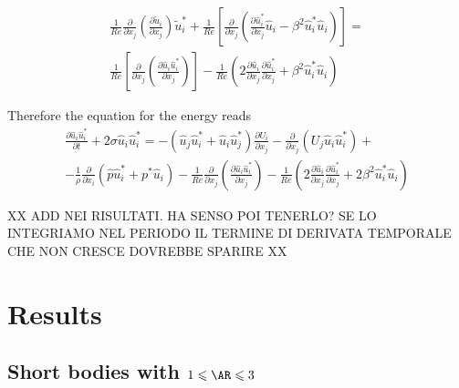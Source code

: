 \documentclass{jfm}
\begin{document}
\begin{itemize}
\begin{equation}
\begin{gathered}
    \frac{1}{Re} \frac{\partial}{\partial x_j} \left( \frac{\partial \tilde{u}_i}{\partial x_j} \right) \tilde{u}_i^* +
    \frac{1}{Re} \left[ \frac{\partial}{\partial x_j} \left( \frac{\partial \hat{u}_i^*}{\partial x_j} \hat{u}_i - \beta^2 \hat{u}_i^* \hat{u}_i \right) \right] = \\
    \frac{1}{Re} \left[ \frac{\partial}{\partial x_j} \left( \frac{\partial \hat{u}_i \hat{u}_i^*}{\partial x_j} \right) \right]
   -\frac{1}{Re} \left( 2 \frac{\partial \hat{u}_i}{\partial x_j} \frac{\partial \hat{u}_i^*}{\partial x_j} + \beta^2 \hat{u}_i^* \hat{u}_i \right)
  \end{gathered}
  \end{equation}
\end{itemize}

Therefore the equation for the energy reads
%
\begin{equation}
\begin{gathered}
\frac{\partial \hat{u}_i \hat{u}_i^*}{\partial t} + 2 \sigma \hat{u}_i \hat{u}_i^* = 
- \left( \hat{u}_j \hat{u}_i^* + \hat{u}_i \hat{u}_j^* \right) \frac{\partial U_i}{\partial x_j} -
\frac{\partial}{\partial x_j} \left( U_j \hat{u}_i \hat{u}_i^*\right)  + \\
- \frac{1}{\rho} \frac{\partial}{\partial x_i} \left( \hat{p} \hat{u}_i^* + p^* \hat{u}_i \right) -
\frac{1}{Re} \frac{\partial}{\partial x_j} \left( \frac{ \partial \hat{u}_i \hat{u}_i^*}{\partial x_j} \right) 
- \frac{1}{Re} \left( 2 \frac{\partial \hat{u}_i}{\partial x_j} \frac{\partial \hat{u}_i^*}{\partial x_j} + 2 \beta^2 \hat{u}_i^* \hat{u}_i \right) 
\end{gathered} 
\end{equation}

XX ADD NEI RISULTATI. HA SENSO POI TENERLO? SE LO INTEGRIAMO NEL PERIODO IL TERMINE DI DERIVATA TEMPORALE CHE NON CRESCE DOVREBBE SPARIRE XX

\section{Results}

\subsection{Short bodies with $1 \le \AR \le 3$}
\end{document}
